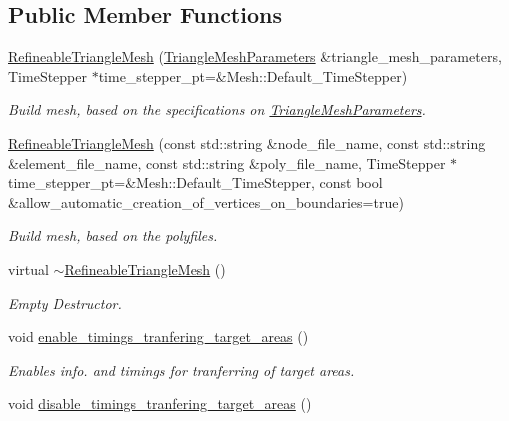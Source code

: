 \subsection*{Public Member Functions}
\begin{DoxyCompactItemize}
\item 
\hyperlink{classoomph_1_1RefineableTriangleMesh_a8285dea563df94b4e450e283088da6d6}{Refineable\+Triangle\+Mesh} (\hyperlink{classoomph_1_1TriangleMeshParameters}{Triangle\+Mesh\+Parameters} \&triangle\+\_\+mesh\+\_\+parameters, Time\+Stepper $\ast$time\+\_\+stepper\+\_\+pt=\&Mesh\+::\+Default\+\_\+\+Time\+Stepper)
\begin{DoxyCompactList}\small\item\em Build mesh, based on the specifications on \hyperlink{classoomph_1_1TriangleMeshParameters}{Triangle\+Mesh\+Parameters}. \end{DoxyCompactList}\item 
\hyperlink{classoomph_1_1RefineableTriangleMesh_a72c24c96f89006c905551b650db29cc7}{Refineable\+Triangle\+Mesh} (const std\+::string \&node\+\_\+file\+\_\+name, const std\+::string \&element\+\_\+file\+\_\+name, const std\+::string \&poly\+\_\+file\+\_\+name, Time\+Stepper $\ast$time\+\_\+stepper\+\_\+pt=\&Mesh\+::\+Default\+\_\+\+Time\+Stepper, const bool \&allow\+\_\+automatic\+\_\+creation\+\_\+of\+\_\+vertices\+\_\+on\+\_\+boundaries=true)
\begin{DoxyCompactList}\small\item\em Build mesh, based on the polyfiles. \end{DoxyCompactList}\item 
virtual \hyperlink{classoomph_1_1RefineableTriangleMesh_a1b8b8e3142e215013533c6ee14c5484e}{$\sim$\+Refineable\+Triangle\+Mesh} ()
\begin{DoxyCompactList}\small\item\em Empty Destructor. \end{DoxyCompactList}\item 
void \hyperlink{classoomph_1_1RefineableTriangleMesh_a0f961b7194d4ee2fc4fc5677a46cdb1c}{enable\+\_\+timings\+\_\+tranfering\+\_\+target\+\_\+areas} ()
\begin{DoxyCompactList}\small\item\em Enables info. and timings for tranferring of target areas. \end{DoxyCompactList}\item 
void \hyperlink{classoomph_1_1RefineableTriangleMesh_ac40e14bcf3cabbf69bbe7df5896a2c5f}{disable\+\_\+timings\+\_\+tranfering\+\_\+target\+\_\+areas} ()

\end{DoxyCompactItemize}
